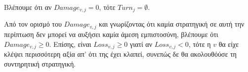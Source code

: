   Βλέπουμε ότι αν $Damage_{v, j} = 0$, τότε $Turn_j = \emptyset$.

  Από τον ορισμό του $Damage_{v,j}$ και γνωρίζοντας ότι καμία στρατηγική σε αυτή την περίπτωση δεν μπορεί να αυξήσει καμία
  άμεση εμπιστοσύνη, βλέπουμε ότι $Damage_{v,j} \geq 0$. Επίσης, είναι $Loss_{v,j} \geq 0$ γιατί αν $Loss_{v,j} < 0$, τότε η
  $v$ θα είχε κλέψει περισσότερη αξία απ' ότι της έχει κλαπεί, συνεπώς δε θα ακολουθόύσε τη συντηρητική στρατηγική.
